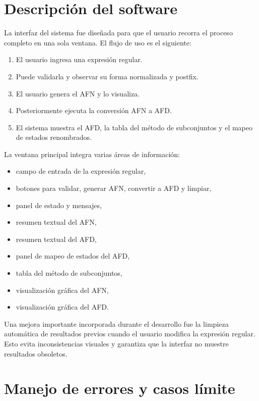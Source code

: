 \documentclass[12pt]{article}
\begin{document}
\section{Descripción del software}

La interfaz del sistema fue diseñada para que el usuario recorra el proceso completo en una sola ventana. El flujo de uso es el siguiente:

\begin{enumerate}[label=\arabic*.]
    \item El usuario ingresa una expresión regular.
    \item Puede validarla y observar su forma normalizada y postfix.
    \item El usuario genera el AFN y lo visualiza.
    \item Posteriormente ejecuta la conversión AFN a AFD.
    \item El sistema muestra el AFD, la tabla del método de subconjuntos y el mapeo de estados renombrados.
\end{enumerate}

La ventana principal integra varias áreas de información:
\begin{itemize}
    \item campo de entrada de la expresión regular,
    \item botones para validar, generar AFN, convertir a AFD y limpiar,
    \item panel de estado y mensajes,
    \item resumen textual del AFN,
    \item resumen textual del AFD,
    \item panel de mapeo de estados del AFD,
    \item tabla del método de subconjuntos,
    \item visualización gráfica del AFN,
    \item visualización gráfica del AFD.
\end{itemize}

Una mejora importante incorporada durante el desarrollo fue la limpieza automática de resultados previos cuando el usuario modifica la expresión regular. Esto evita inconsistencias visuales y garantiza que la interfaz no muestre resultados obsoletos.

\section{Manejo de errores y casos límite}
\end{document}
